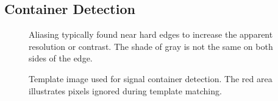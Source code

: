 \subsection{Container Detection}
\label{sec:container_detection}
\begin{figure}[ht]
    \centering
    \begin{minipage}[t]{0.45\textwidth}
        \caption[Aliasing example found near hard edges]{Aliasing typically found near hard edges to increase the apparent resolution or contrast. The shade of gray is not the same on both sides of the edge.}
        \label{fig:aliasing}
    \end{minipage}
    \hfill
    \begin{minipage}[t]{0.45\textwidth}
        \caption[Signal container detection template]{Template image used for signal container detection. The red area illustrates pixels ignored during template matching.}
        \label{fig:container_template}
    \end{minipage}
\end{figure}
